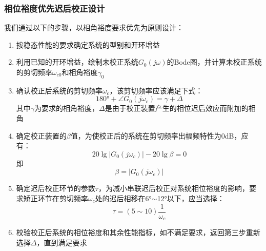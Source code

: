 \subsubsection{相位裕度优先迟后校正设计}
我们通过以下的步骤，以相角裕度要求优先为原则设计：
\begin{enumerate}
    \item 按稳态性能的要求确定系统的型别和开环增益
    \item 利用已知的开环增益，绘制未校正系统$G_0(j\omega)$的Bode图，并计算未校正系统的剪切频率$\omega_{c0}$和相角裕度$\gamma_0$
    \item 确认校正后系统的剪切频率$\omega_c$，该剪切频率应该满足下式：
    \begin{equation*}
        180\text{°}+ \angle G_0(j\omega_c) = \gamma + \Delta
    \end{equation*}
    其中$\gamma$为要求的相角裕度，$\Delta$是由于校正装置产生的相位迟后效应而附加的相角
    \item 确定校正装置的$\beta$值，为使校正后的系统在剪切频率出幅频特性为0dB，应有：
    \begin{equation*}
        20 \lg \left\lvert G_0(j\omega_c) \right\rvert - 20\lg \beta = 0 
    \end{equation*}
    即
    \begin{equation*}
        \beta = \left\lvert G_0(j\omega_c) \right\rvert 
    \end{equation*}
    \item 确定迟后校正环节的参数$\tau$，为减小串联迟后校正对系统相位裕度的影响，要求矫正环节在剪切频率$\omega_c$处的迟后相移在6°$\sim$12°以下，应当选择：
    \begin{equation*}
        \tau = (5 \sim 10) \frac{1}{\omega_c}
    \end{equation*}
    \item 校验校正后系统的相位裕度和其余性能指标，如不满足要求，返回第三步重新选择$\Delta$，直到满足要求
\end{enumerate}


